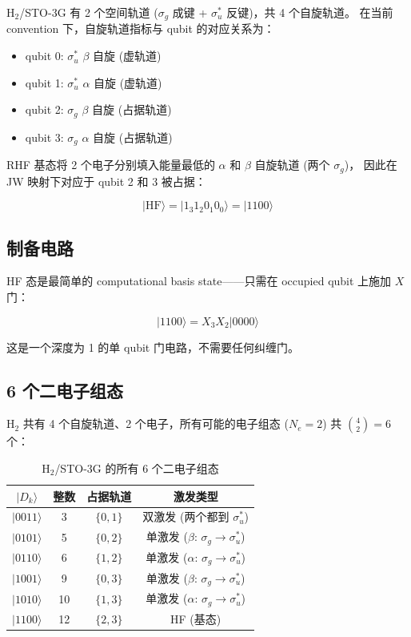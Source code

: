 \documentclass[fontset=mac]{ctexart}
\newcommand{\Xop}{X}
\newcommand{\ket}[1]{|#1\rangle}
\begin{document}
H$_2$/STO-3G 有 2 个空间轨道 ($\sigma_g$ 成键 + $\sigma_u^*$ 反键)，共 4 个自旋轨道。
在当前 convention 下，自旋轨道指标与 qubit 的对应关系为：

\begin{itemize}
    \item qubit 0: $\sigma_u^*$ $\beta$ 自旋 (虚轨道)
    \item qubit 1: $\sigma_u^*$ $\alpha$ 自旋 (虚轨道)
    \item qubit 2: $\sigma_g$ $\beta$ 自旋 (占据轨道)
    \item qubit 3: $\sigma_g$ $\alpha$ 自旋 (占据轨道)
\end{itemize}

RHF 基态将 2 个电子分别填入能量最低的 $\alpha$ 和 $\beta$ 自旋轨道 (两个 $\sigma_g$)，
因此在 JW 映射下对应于 qubit 2 和 3 被占据：

\begin{equation}
    \boxed{\ket{\text{HF}} = \ket{1_3 1_2 0_1 0_0} = \ket{1100}}
\end{equation}

\subsection*{制备电路}

HF 态是最简单的 computational basis state——只需在 occupied qubit 上施加 $\Xop$ 门：

\begin{equation}
    \ket{1100} = \Xop_3 \Xop_2 \ket{0000}
\end{equation}

这是一个深度为 1 的单 qubit 门电路，不需要任何纠缠门。

\subsection*{6 个二电子组态}

H$_2$ 共有 4 个自旋轨道、2 个电子，所有可能的电子组态 ($N_e=2$) 共 $\binom{4}{2}=6$ 个：

\begin{table}[H]
\centering
\begin{tabular}{c|c|c|c}
\toprule
$\ket{D_k}$ & 整数 & 占据轨道 & 激发类型 \\
\midrule
$\ket{0011}$ &  3 & $\{0,1\}$ & 双激发 (两个都到 $\sigma_u^*$) \\
$\ket{0101}$ &  5 & $\{0,2\}$ & 单激发 ($\beta$: $\sigma_g\to\sigma_u^*$) \\
$\ket{0110}$ &  6 & $\{1,2\}$ & 单激发 ($\alpha$: $\sigma_g\to\sigma_u^*$) \\
$\ket{1001}$ &  9 & $\{0,3\}$ & 单激发 ($\beta$: $\sigma_g\to\sigma_u^*$) \\
$\ket{1010}$ & 10 & $\{1,3\}$ & 单激发 ($\alpha$: $\sigma_g\to\sigma_u^*$) \\
$\ket{1100}$ & 12 & $\{2,3\}$ & HF (基态) \\
\bottomrule
\end{tabular}
\caption{H$_2$/STO-3G 的所有 6 个二电子组态}
\end{table}
\end{document}
